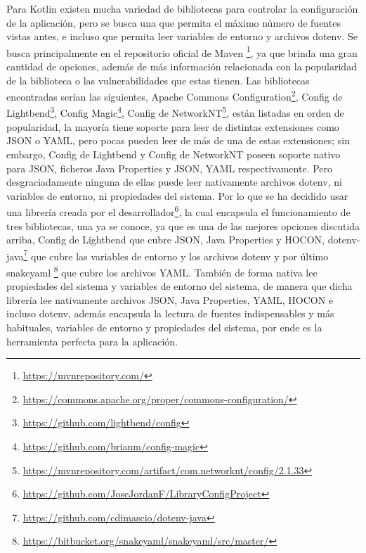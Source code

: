 Para Kotlin existen mucha variedad de bibliotecas para controlar la configuración de la aplicación, pero se busca 
una que permita el máximo número de fuentes vistas antes, e incluso que permita leer variables de entorno y archivos 
dotenv. Se busca principalmente en el repositorio oficial de Maven \footnote{\url{https://mvnrepository.com/}}, ya 
que brinda una gran cantidad de opciones, además de más información relacionada con la popularidad de la biblioteca 
o las vulnerabilidades que estas tienen. Las bibliotecas encontradas serían las siguientes, Apache Commons 
Configuration\footnote{\url{https://commons.apache.org/proper/commons-configuration/}}, Config de 
Lightbend\footnote{\url{https://github.com/lightbend/config}}, Config 
Magic\footnote{\url{https://github.com/brianm/config-magic}}, Config de 
NetworkNT\footnote{\url{https://mvnrepository.com/artifact/com.networknt/config/2.1.33}}, están listadas en orden de
popularidad, la mayoría tiene soporte para leer de distintas extensiones como JSON o YAML, pero pocas pueden leer de
más de una de estas extensiones; sin embargo, Config de Lightbend y  Config de NetworkNT poseen soporte nativo para 
JSON, ficheros Java Properties y JSON, YAML respectivamente. Pero desgraciadamente ninguna de ellas puede leer 
nativamente archivos dotenv, ni variables de entorno, ni propiedades del sistema. Por lo que se ha decidido usar una 
librería creada por el desarrollador\footnote{\url{https://github.com/JoseJordanF/LibraryConfigProject}}, la 
cual encapsula el funcionamiento de tres bibliotecas, una ya se conoce, ya que es una de las mejores opciones 
discutida arriba, Config de Lightbend que cubre JSON, Java Properties y HOCON, dotenv-
java\footnote{\url{https://github.com/cdimascio/dotenv-java}} que cubre las variables de entorno y los archivos 
dotenv y por último snakeyaml \footnote{\url{https://bitbucket.org/snakeyaml/snakeyaml/src/master/}} que cubre los 
archivos YAML. También de forma nativa lee propiedades del sistema y variables de entorno del sistema, de manera que 
dicha librería lee nativamente archivos JSON, Java Properties, YAML, HOCON e incluso dotenv, además encapsula la 
lectura de fuentes indispensables y más habituales, variables de entorno y propiedades del sistema, por ende es la 
herramienta perfecta para la aplicación.


